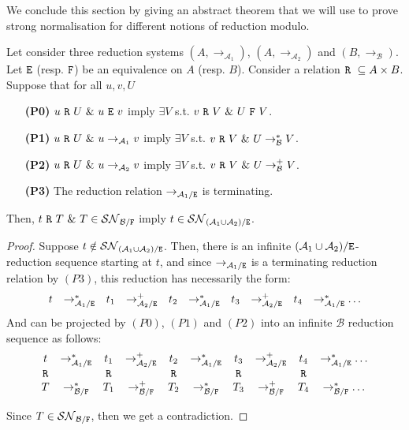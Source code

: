 \documentclass{LMCS}
\renewcommand{\>}{\rightarrow}
\newcommand{\Rew}[1]{\rightarrow_{#1}}
\newcommand{\Rewn}[2][*]{\rightarrow^{#1}_{#2}}
\newcommand{\Rewp}[1]{\rightarrow^{+}_{#1}}
\newcommand{\SN}[1]{\mathcal{SN}_{#1}}
\newcommand{\calA}{\mathcal{A}}
\newcommand{\calB}{\mathcal{B}}
\newcommand{\ttE}{{\tt E}}
\newcommand{\ttF}{{\tt F}}
\newcommand{\ttR}{{\tt R}}
\newcommand{\modulo}[2]{#1/#2}
\begin{document}
We conclude this section by giving an abstract theorem that we will
use to prove strong normalisation for different notions of reduction
modulo.

 
\begin{thm}
\label{t:equational-abstract}
 Let consider three reduction systems $(A, \Rew{\calA_1})$,    $(A, \Rew{\calA_2})$
and $(B, \Rew{\calB})$. Let 
$\ttE$ (resp. $\ttF$) be an equivalence on $A$ (resp. $B$). 
Consider a relation $\ttR\ \subseteq A \times B$. Suppose
that for all $u,v,U$


\begin{enumerate}[\bf(P1)]
\item[{\bf (P0)}] $u\ \ttR\ U\ \&\ u\ \ttE\ v$ imply  $\exists V$
      s.t. $v\ \ttR\ V\ \&\ U\ \ttF\  V$.
\item[{\bf (P1)}] $u\ \ttR\ U\ \&\ u \Rew{\calA_1} v$ imply   $\exists V$
      s.t. $v\ \ttR\ V\ \&\ U \Rewn{\calB} V$.
\item[{\bf (P2)}] $u\ \ttR\ U\ \&\ u \Rew{\calA_2} v$ imply   $\exists V$
      s.t. $v\ \ttR\ V\ \&\ U \Rewp{\calB} V$.
\item[{\bf (P3)}] The reduction relation $\Rew{\modulo{\calA_1}{\ttE}}$ is  
terminating.
\end{enumerate}

Then, $t\ \ttR\ T\ \&\ T \in \SN{\modulo{\calB}\ttF}$ imply  $t \in
\SN{(\calA_1 \cup \calA_2)/\ttE}$.
\end{thm}

\begin{proof}
Suppose $t\notin \SN{(\calA_1\cup \calA_2)/\ttE}$. Then, there is an
infinite $(\calA_1\cup \calA_2)/\ttE$-reduction sequence starting at $t$,
and since $\Rew{\modulo{\calA_1}{\ttE}}$ is a terminating reduction  relation by
$(P3)$, this reduction has necessarily the form:
\[\begin{array}{ccccccccccccccccc}
   t&\Rewn{\calA_1/\ttE}&t_1&\Rewp{\calA_2/\ttE}&t_2&\Rewn{\calA_1/\ttE}&t_3&\Rewp{\calA_2/\ttE}&t_4&\Rewn{\calA_1/\ttE}\ldots
  \end{array}\]
And can be projected by $(P0)$, $(P1)$ and $(P2)$ into an infinite $\calB$ reduction sequence as follows:
\[\begin{array}{ccccccccccccccccc}
   t&\Rewn{\calA_1/\ttE}&t_1&\Rewp{\calA_2/\ttE}&t_2&\Rewn{\calA_1/\ttE}&t_3&\Rewp{\calA_2/\ttE}&t_4&\Rewn{\calA_1/\ttE}\ldots\\
      \ttR&&\ttR&&\ttR&&\ttR&&\ttR\\
      T&\Rewn{\calB/\ttF}&T_1&\Rewp{\calB/\ttF}&T_2&\Rewn{\calB/\ttF}&T_3&\Rewp{\calB/\ttF}&T_4&\Rewn{\calB/\ttF}\ldots
  \end{array}\]

Since $T \in \SN{\calB/\ttF}$, then we get a contradiction. 
  \end{proof}
\end{document}
